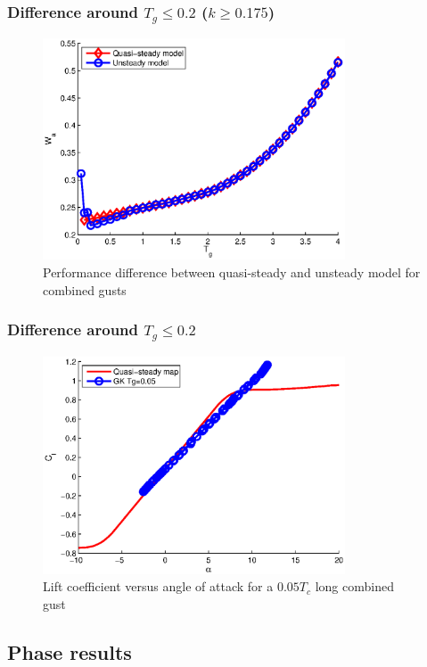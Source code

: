 \documentclass[compress]{beamer}
\begin{document}
\begin{frame}
  \frametitle{Difference around $T_g \le0.2$ ($k \ge 0.175$)}
  \begin{figure}[h]
    \centering
    \includegraphics[width=0.8\textwidth]{./Figures/LUT_vs_GK_Wg_vs_TG_windtype=3_alhpamax=12_nodalphalimit.eps}
    \caption{Performance difference between quasi-steady and unsteady model for combined gusts}
  \end{figure}
\end{frame}

\begin{frame}
  \frametitle{Difference around $T_g \le0.2$}

  \begin{figure}[h]
    \centering
    \includegraphics[width=0.8\textwidth]{./Figures/Cl_vs_alpha_Windtype=3_Tg=0p05_GK_alphamax=12.eps}
    \caption{Lift coefficient versus angle of attack for a $0.05T_c$ long combined gust}
  \end{figure}
\end{frame}

\subsection{Phase results}
\end{document}
